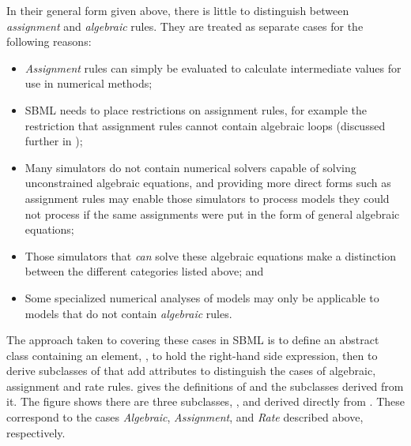 In their general form given above, there is little to distinguish
between \emph{assignment} and \emph{algebraic} rules.  They are
treated as separate cases for the following reasons:
\begin{itemize}
  
\item \emph{Assignment} rules can simply be evaluated to calculate
  intermediate values for use in numerical methods;
  
\item SBML needs to place restrictions on assignment rules, for
  example the restriction that assignment rules cannot contain
  algebraic loops (discussed further in
  );

\item Many simulators do not contain numerical solvers capable of
  solving unconstrained algebraic equations, and providing more
  direct forms such as assignment rules may enable those
  simulators to process models they could not process if the same
  assignments were put in the form of general algebraic equations;
  
\item Those simulators that \emph{can} solve these algebraic
  equations make a distinction between the different categories
  listed above; and
  
\item Some specialized numerical analyses of models may only be
  applicable to models that do not contain \emph{algebraic} rules.

\end{itemize}

The approach taken to covering these cases in SBML is to define an
abstract \Rule class containing an element,
, to hold the right-hand side expression, then to
derive subclasses of \Rule that add attributes to
distinguish the cases of algebraic, assignment and rate rules.
 gives the definitions of \Rule and the
subclasses derived from it.  The figure shows there are three
subclasses, \AlgebraicRule, \AssignmentRule and \RateRule derived
directly from \Rule. These correspond to the cases
\emph{Algebraic}, \emph{Assignment}, and \emph{Rate} described
above, respectively.

